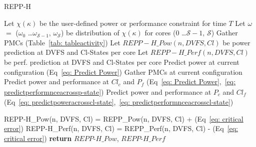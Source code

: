 
\begin{algorithm}[t]
    \caption{REPP-H}
  \label{pseudo:multi}
    \begin{algorithmic}[1]
      \Statex {}
        \State Let $\chi(\kappa)$ be the user-defined power or performance constraint for time $T$
        \State Let $\omega$ $=$ ($\omega_{\mathit{0}}$ \ldots $\omega_{\mathit{\mathcal S-1}}$, $\omega_{\mathit{\mathcal S}}$) be distribution of $\chi(\kappa)$ for cores (0 \ldots $\mathcal S-1$, $\mathcal S$)
      \State Gather PMCs (Table~\ref{tab: tableactivity}) %
      \State Let {\small $REPP-H\_Pow(n, DVFS, Cl)$} be power prediction at DVFS and Cl-States per core 
      \Statex {}
      \State Let {\small $REPP-H\_Perf(n, DVFS, Cl)$} be perf. prediction at DVFS and Cl-States per core
      \State Predict power at current configuration (Eq~\ref{eq: Predict Power})
      \State Gather PMCs at current configuration 
      \State Predict power and performance at $Cl_{\mathit{c}}$ and $P_{\mathit{f}}$ (Eq~\ref{eq: Predict Power},~\ref{eq: predictperformnceacrossp-state})
      \State Predict power and performance at $P_{\mathit{c}}$ and $Cl_{\mathit{f}}$ (Eq~\ref{eq: predictpoweracrosscl-state},~\ref{eq: predictperformnceacrosscl-state})
      \Statex {}

     
                \State REPP-H\_Pow(n, DVFS, Cl) = REPP\_Pow(n, DVFS, Cl) + (Eq~\ref{eq: critical error})
                \State REPP-H\_Perf(n, DVFS, Cl) = REPP\_Perf(n, DVFS, Cl) - (Eq~\ref{eq: critical error})
              \EndFor 
          \EndFor
      \EndFor
      \State \textbf{return} $REPP$-$H\_Pow$, $REPP$-$H\_Perf$
\EndFunction
    
  \end{algorithmic}
\end{algorithm}


